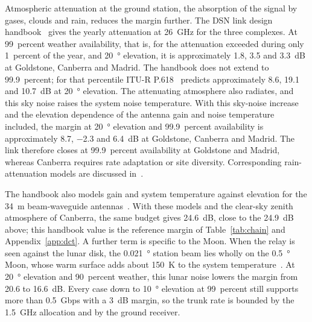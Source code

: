 \documentclass{IEEEoj}
\begin{document}
Atmospheric attenuation at the ground station, the absorption of the signal by gases, clouds and rain, reduces the margin further. The DSN link design handbook~\cite{dsn_810_005} gives the yearly attenuation at \SI{26}{GHz} for the three complexes. At 99~percent weather availability, that is, for the attenuation exceeded during only 1~percent of the year, and \SI{20}{\degree} elevation, it is approximately \SI{1.8}{}, \SI{3.5}{} and \SI{3.3}{dB} at Goldstone, Canberra and Madrid. The handbook does not extend to 99.9~percent; for that percentile ITU-R P.618~\cite{itu_p618} predicts approximately \SI{8.6}{}, \SI{19.1}{} and \SI{10.7}{dB} at \SI{20}{\degree} elevation. The attenuating atmosphere also radiates, and this sky noise raises the system noise temperature. With this sky-noise increase and the elevation dependence of the antenna gain and noise temperature~\cite{dsn_34m_bwg} included, the margin at \SI{20}{\degree} elevation and 99.9~percent availability is approximately \SI{8.7}{}, \SI{-2.3}{} and \SI{6.4}{dB} at Goldstone, Canberra and Madrid. The link therefore closes at 99.9~percent availability at Goldstone and Madrid, whereas Canberra requires rate adaptation or site diversity. Corresponding rain-attenuation models are discussed in~\cite{islam_ka_band}.

The handbook also models gain and system temperature against elevation for the \SI{34}{m} beam-waveguide antennas~\cite{dsn_34m_bwg}. With these models and the clear-sky zenith atmosphere of Canberra, the same budget gives \SI{24.6}{dB}, close to the \SI{24.9}{dB} above; this handbook value is the reference margin of Table~\ref{tab:chain} and Appendix~\ref{app:dct}. A further term is specific to the Moon. When the relay is seen against the lunar disk, the \SI{0.021}{\degree} station beam lies wholly on the \SI{0.5}{\degree} Moon, whose warm surface adds about \SI{150}{K} to the system temperature~\cite{dsn_810_005}. At \SI{20}{\degree} elevation and 90~percent weather, this lunar noise lowers the margin from \SI{20.6}{} to \SI{16.6}{dB}. Every case down to \SI{10}{\degree} elevation at 99~percent still supports more than \SI{0.5}{Gbps} with a \SI{3}{dB} margin, so the trunk rate is bounded by the \SI{1.5}{GHz} allocation and by the ground receiver.
\end{document}
